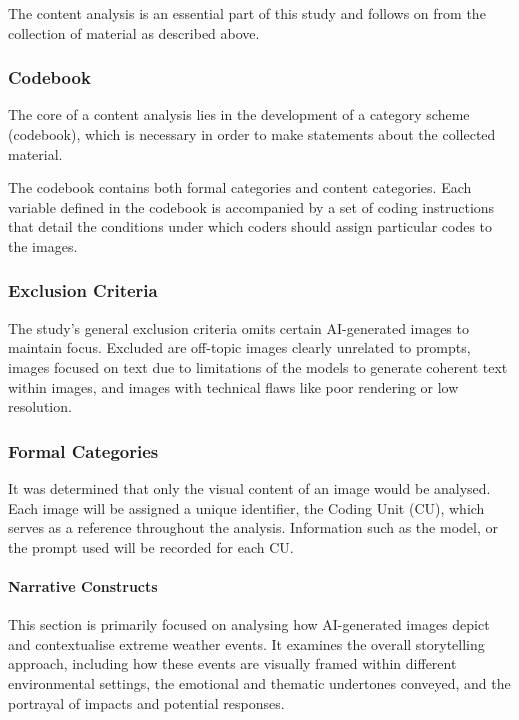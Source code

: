The content analysis is an essential part of this study and follows on from the collection of material as described above. 

\subsubsection{Codebook}
\label{subsubsec:codebook}

The core of a content analysis lies in the development of a category scheme (codebook), which is necessary in order to make statements about the collected material.

The codebook contains both formal categories and content categories. Each variable defined in the codebook is accompanied by a set of coding instructions that detail the conditions under which coders should assign particular codes to the images. 

\subsubsection{Exclusion Criteria}
The study's general exclusion criteria omits certain AI-generated images to maintain focus. Excluded are off-topic images clearly unrelated to prompts, images focused on text due to limitations of the models to generate coherent text within images, and images with technical flaws like poor rendering or low resolution.

\subsubsection{Formal Categories}
\label{subsubsec:formal-categories}
It was determined that only the visual content of an image would be analysed. Each image will be assigned a unique identifier, the Coding Unit (CU), which serves as a reference throughout the analysis. Information such as the model, or the prompt used will be recorded for each CU.

\paragraph{Narrative Constructs}
\label{subsubsec:content-categories}
This section is primarily focused on analysing how AI-generated images depict and contextualise extreme weather events. It examines the overall storytelling approach, including how these events are visually framed within different environmental settings, the emotional and thematic undertones conveyed, and the portrayal of impacts and potential responses.

